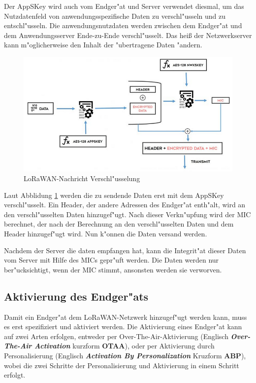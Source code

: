Der AppSKey wird auch vom Endger"at und Server verwendet diesmal, um das Nutzdatenfeld von anwendungsspezifische Daten zu verschl"usseln und zu entschl"usseln. Die anwendungsnutzdaten werden zwischen dem Endger"at und dem Anwendungsserver Ende-zu-Ende verschl"usselt. Das hei\ss{} der Netzwerkserver kann m"oglicherweise den Inhalt der "ubertragene Daten "andern. 

\begin{figure}[h]
	\centering
	\includegraphics[width=14cm]{source/images/WAN}
	\caption{LoRaWAN-Nachricht Verschl"usselung \cite{Entcription}\label{fig:Entcription}}
\end{figure}

Laut Abblidung \ref{fig:Entcription} werden die zu sendende Daten erst mit dem AppSKey verschl"usselt. Ein Header, der andere Adressen des Endger"at enth"alt, wird an den verschl"usselten Daten hinzugef"ugt. Nach dieser Verkn"upfung wird der MIC berechnet, der nach der Berechnung an den verschl"usselten Daten und dem Header hinzugef"ugt wird. Nun k"onnen die Daten versand werden. 

Nachdem der Server die daten empfangen hat, kann die Integrit"at dieser Daten vom Server mit Hilfe des MICs gepr"uft werden. Die Daten werden nur ber"ucksichtigt, wenn der MIC stimmt, ansonsten werden sie verworven.  

\subsection{Aktivierung des Endger"ats}
Damit ein Endger"at dem LoRaWAN-Netzwerk hinzugef"ugt werden kann, muss es erst spezifiziert und aktiviert werden. Die Aktivierung eines Endger"at kann auf zwei Arten erfolgen, entweder per Over-The-Air-Aktivierung (Englisch \textbf{\textit{Over-The-Air Activation}} kurzform \textbf{OTAA}), oder per Aktivierung durch Personalisierung (Englisch \textbf{\textit{Activation By Personalization}} Kruzform \textbf{ABP}), wobei die zwei Schritte der Personalisierung und Aktivierung in einem Schritt erfolgt. 

